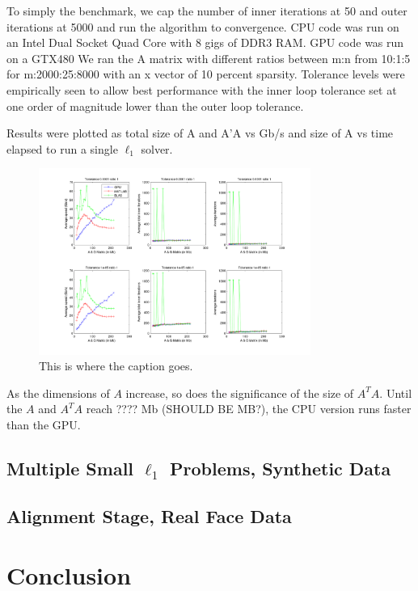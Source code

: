 \documentclass[10pt,twocolumn,letterpaper]{article}
\begin{document}
To simply the benchmark, we cap the number of inner iterations at 50 and outer iterations
at 5000 and run the algorithm to convergence.  CPU code was run on an Intel
Dual Socket Quad Core with 8 gigs of DDR3 RAM.  GPU code was run on a GTX480 We
ran the A matrix with different ratios between m:n from 10:1:5 for m:2000:25:8000 with an x vector of 10 percent sparsity.  Tolerance levels were
empirically seen to allow best performance with the inner loop tolerance set at
one order of magnitude lower than the outer loop tolerance.

Results were plotted as total size of A and A'A vs Gb/s and size of A vs time
elapsed to run a single $\ell_1$ solver.


\begin{figure}
\centering
\includegraphics[width=3.5in]{figures/PALM_benchmark_ratio_1.png}
\caption{This is where the caption goes.}
\label{fig:uniqueidentifierforthisimage}
\end{figure}

As the dimensions of $A$ increase, so does the significance of the size of
$A^TA$.  Until the $A$ and $A^TA$ reach ???? Mb (SHOULD BE MB?), the CPU version runs faster
than the GPU.  

\subsection{Multiple Small $\ell_1$ Problems, Synthetic Data}

\subsection{Alignment Stage, Real Face Data}

\section{Conclusion}

{\small


}
\end{document}

